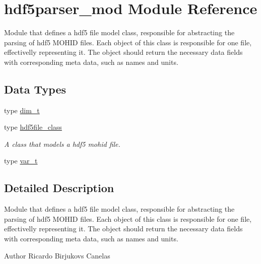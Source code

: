\hypertarget{namespacehdf5parser__mod}{}\section{hdf5parser\+\_\+mod Module Reference}
\label{namespacehdf5parser__mod}


Module that defines a hdf5 file model class, responsible for abstracting the parsing of hdf5 M\+O\+H\+ID files. Each object of this class is responsible for one file, effectivelly representing it. The object should return the necessary data fields with corresponding meta data, such as names and units.  


\subsection*{Data Types}
\begin{DoxyCompactItemize}
\item 
type \mbox{\hyperlink{structhdf5parser__mod_1_1dim__t}{dim\+\_\+t}}
\item 
type \mbox{\hyperlink{structhdf5parser__mod_1_1hdf5file__class}{hdf5file\+\_\+class}}
\begin{DoxyCompactList}\small\item\em A class that models a hdf5 mohid file. \end{DoxyCompactList}\item 
type \mbox{\hyperlink{structhdf5parser__mod_1_1var__t}{var\+\_\+t}}
\end{DoxyCompactItemize}


\subsection{Detailed Description}
Module that defines a hdf5 file model class, responsible for abstracting the parsing of hdf5 M\+O\+H\+ID files. Each object of this class is responsible for one file, effectivelly representing it. The object should return the necessary data fields with corresponding meta data, such as names and units. 

\begin{DoxyAuthor}{Author}
Ricardo Birjukovs Canelas 
\end{DoxyAuthor}
